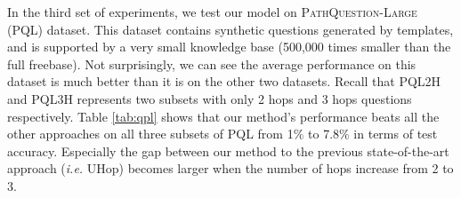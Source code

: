In the third set of experiments, we test our model on \textsc{PathQuestion-Large} (PQL) dataset. This dataset contains synthetic questions generated by templates, and is supported by a very small knowledge base (500,000 times smaller than the full freebase). Not surprisingly, we can see the average performance on this dataset is much better than it is on the other two datasets. Recall that PQL2H and PQL3H represents two subsets with only 2 hops and 3 hops questions respectively. Table \ref{tab:qpl} shows that our method's performance beats all the other approaches on all three subsets of PQL from 1$\%$ to 7.8$\%$ in terms of test accuracy. Especially the gap between our method to the previous state-of-the-art approach (\emph{i.e.} UHop) becomes larger when the number of hops increase from 2 to 3. 





 


